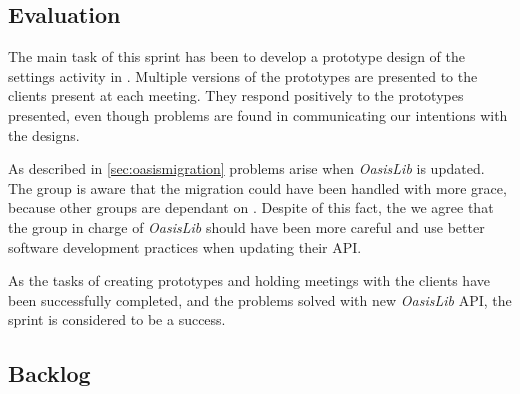 \subsection{Evaluation}
The main task of this sprint has been to develop a prototype design of the settings activity in \launcher.
Multiple versions of the prototypes are presented to the clients present at each meeting.
They respond positively to the prototypes presented, even though problems are found in communicating our intentions with the designs.

As described in \cref{sec:oasismigration} problems arise when \textit{OasisLib} is updated.
The group is aware that the migration could have been handled with more grace, because other groups are dependant on \launcher.
Despite of this fact, the we agree that the group in charge of \textit{OasisLib} should have been more careful and use better software development practices when updating their API.

As the tasks of creating prototypes and holding meetings with the clients have been successfully completed, and the problems solved with new \textit{OasisLib} API, the sprint is considered to be a success.

\subsection{Backlog}\label{sec:sprint2:backlog}
